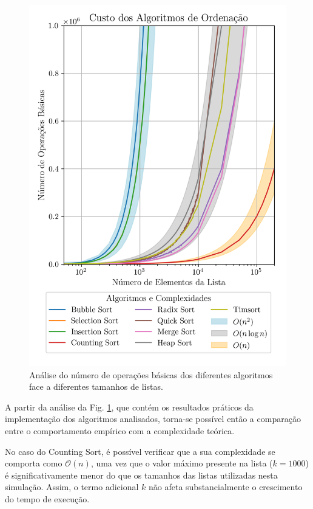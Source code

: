 \documentclass[conference]{IEEEtran}
\begin{document}
\begin{figure}[H]
    \centering
    \includegraphics[width=1\linewidth]{sorting_complexities.png}
    \caption{Análise do número de operações básicas dos diferentes algoritmos face a diferentes tamanhos de listas.}
    \label{fig:sorting_complexities}
\end{figure}

A partir da análise da Fig. \ref{fig:sorting_complexities}, que contém os resultados práticos da implementação dos algoritmos analisados, torna-se possível então a comparação entre o comportamento empírico com a complexidade teórica.

No caso do Counting Sort, é possível verificar que a sua complexidade se comporta como \( \mathcal{O}(n) \), uma vez que o valor máximo presente na lista (\( k = 1000 \)) é significativamente menor do que os tamanhos das listas utilizadas nesta simulação. Assim, o termo adicional \( k \) não afeta substancialmente o crescimento do tempo de execução.
\end{document}
